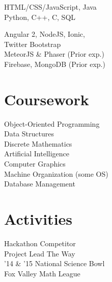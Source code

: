 \documentclass[]{hieudo-build}
\begin{document}
\begin{minipage}[t]{0.34\textwidth}
HTML/CSS/JavaScript, Java
\\Python, C++, C, SQL

Angular 2, NodeJS, Ionic, 
\\Twitter Bootstrap 
\\MeteorJS \& Phaser (Prior exp.) \\

Firebase, MongoDB (Prior exp.) \\

\sectionsep



\section{Coursework}
Object-Oriented Programming\\
Data Structures \\
Discrete Mathematics \\
Artificial Intelligence \\
Computer Graphics \\
Machine Organization (some OS) \\
Database Management
\sectionsep

\section{Activities}
Hackathon Competitor \\
Project Lead The Way\\
'14 \& '15 National Science Bowl\\
Fox Valley Math League 
\sectionsep


\end{minipage}
\end{document}
